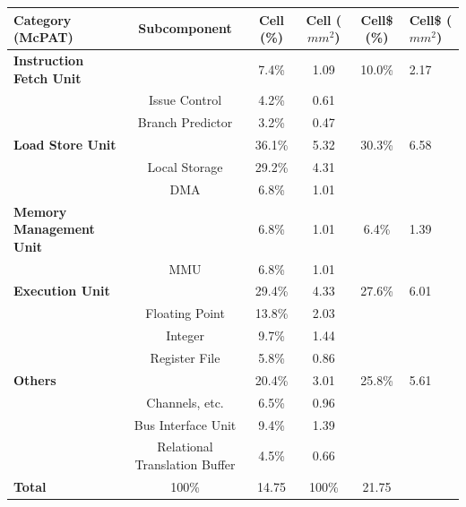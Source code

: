 \documentclass{sig-alternate-05-2015}
\begin{document}
\begin{table}[t]
\small
\centering
\begin{tabular}{| l | c | c | c | c | l |} \hline
\textbf{Category (McPAT)} & \textbf{Subcomponent} & \textbf{Cell (\%)} & \textbf{Cell ($mm^2$)} & \textbf{Cell\$ (\%)} & \textbf{Cell\$ ($mm^2$) }\\ \hline
\textbf{Instruction Fetch Unit}  & &  7.4\% & 1.09 & 10.0\% & 2.17 \\ \hline
  & Issue Control & 4.2\% & 0.61 & & \\ \hline
  & Branch Predictor & 3.2\% & 0.47  & & \\ \hline
\textbf{Load Store Unit}  & & 36.1\%  & 5.32 & 30.3\% & 6.58 \\ \hline
  & Local Storage & 29.2\% & 4.31 & & \\ \hline
  & DMA & 6.8\% & 1.01  & & \\ \hline  
\textbf{Memory Management Unit} &  & 6.8\% & 1.01 & 6.4\% & 1.39 \\ \hline
 &  MMU & 6.8\% & 1.01   & & \\ \hline  
\textbf{Execution Unit}  & & 29.4\% & 4.33 & 27.6\% & 6.01  \\ \hline
 & Floating Point & 13.8\% & 2.03      & & \\ \hline  
 &  Integer & 9.7\% & 1.44      & & \\ \hline  
 & Register File & 5.8\%  & 0.86      & & \\ \hline  
\textbf{Others} &  & 20.4\% & 3.01 & 25.8\% & 5.61  \\ \hline
 & Channels, etc. & 6.5\% & 0.96      & & \\ \hline  
 & Bus Interface Unit  & 9.4\%  & 1.39      & & \\ \hline  
 & Relational Translation Buffer & 4.5\% & 0.66      & & \\ \hline  
\textbf{Total}  & 100\%  & 14.75 & 100\% & 21.75   \\ \hline
\end{tabular}
\label{table:spe_area}
\end{table}
\end{document}
